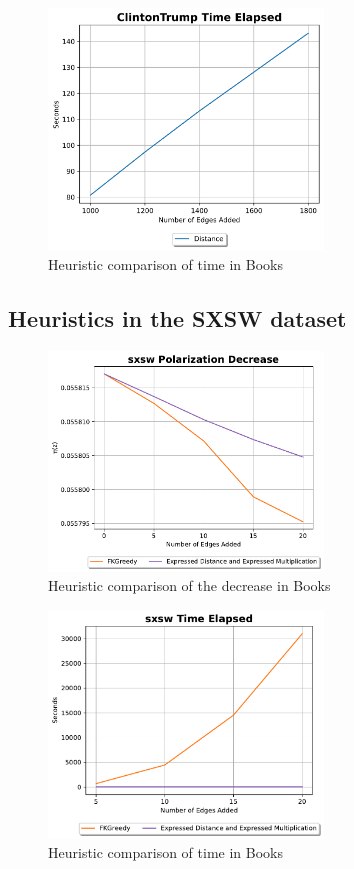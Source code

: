 \begin{figure}[H]
	\centering
	\includegraphics[width=0.65\textwidth]{Figures/ClintonTrump Time Elapsed 2}
	\caption{Heuristic comparison of time in Books}
	\label{fig:ClintonTrump_time}
\end{figure}
\clearpage


\subsection{Heuristics in the SXSW dataset}
\begin{figure}[H]
	\centering
	\includegraphics[width=0.65\textwidth]{Figures/sxsw Polarization Decrease}
	\caption{Heuristic comparison of the decrease in Books}
	\label{fig:sxsw_pol}
\end{figure}


\begin{figure}[H]
	\centering
	\includegraphics[width=0.65\textwidth]{Figures/sxsw Time Elapsed}
	\caption{Heuristic comparison of time in Books}
	\label{fig:sxsw_time}
\end{figure}

